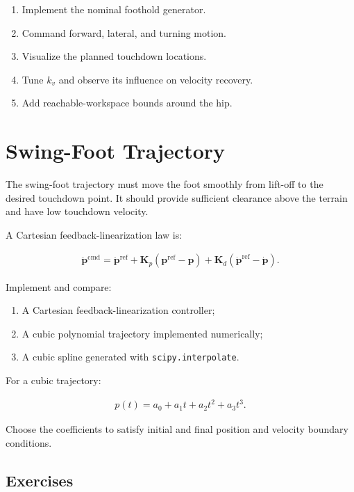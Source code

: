 \documentclass[11pt,a4paper]{article}
\begin{document}
\begin{enumerate}[label=\arabic*.]
    \item Implement the nominal foothold generator.
    \item Command forward, lateral, and turning motion.
    \item Visualize the planned touchdown locations.
    \item Tune \(k_v\) and observe its influence on velocity recovery.
    \item Add reachable-workspace bounds around the hip.
\end{enumerate}

\section{Swing-Foot Trajectory}

The swing-foot trajectory must move the foot smoothly from lift-off to the desired touchdown point. It should provide sufficient clearance above the terrain and have low touchdown velocity.

A Cartesian feedback-linearization law is:

\begin{align*}
\ddot{\bm{p}}^{\mathrm{cmd}} =
\ddot{\bm{p}}^{\mathrm{ref}}
+
\bm{K}_p
\left(
\bm{p}^{\mathrm{ref}}-\bm{p}
\right)
+
\bm{K}_d
\left(
\dot{\bm{p}}^{\mathrm{ref}}-\dot{\bm{p}}
\right).
\end{align*}

Implement and compare:

\begin{enumerate}[label=\arabic*.]
    \item A Cartesian feedback-linearization controller;
    \item A cubic polynomial trajectory implemented numerically;
    \item A cubic spline generated with \texttt{scipy.interpolate}.
\end{enumerate}

For a cubic trajectory:

\begin{align*}
p(t) = a_0 + a_1t + a_2t^2 + a_3t^3.
\end{align*}

Choose the coefficients to satisfy initial and final position and velocity boundary conditions.

\subsection*{Exercises}
\end{document}
